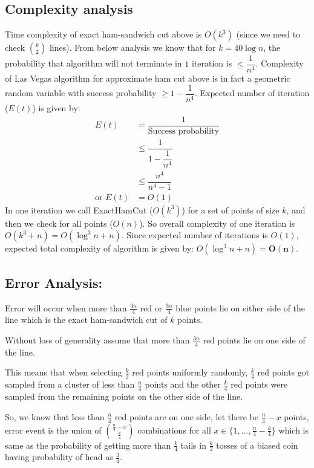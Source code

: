 \documentclass[a4paper]{article}
\newcommand{\V}[1]{\boldsymbol{#1}}
\begin{document}
\subsection*{Complexity analysis}
Time complexity of exact ham-sandwich cut above is $O(k^3)$ (since we need to check $k\choose2$ lines). From below analysis we know that for $k = 40\log n$, the probability that algorithm will not terminate in $1$ iteration is $\leq \dfrac{1}{n^4}$. Complexity of Las Vegas algorithm for approximate ham cut above is in fact a geometric random variable with success probability $\geq 1- \dfrac{1}{n^4}$. Expected number of iteration ($E(t)$) is given by:
\begin{align*} 
E(t) &= \dfrac{1}{\text{Success probability}} \\
	 &\leq \dfrac{1}{ 1- \dfrac{1}{n^4}} \\
	 &\leq \dfrac{n^4}{n^4 - 1} \\
\text{or } E(t) &= O(1)
\end{align*}
In one iteration we call ExactHamCut ($O(k^3)$) for a set of points of size $k$, and then we check for all points ($O(n)$). So overall complexity of one iteration is $O(k^3 + n) = O(\log^3 n + n)$. Since expected number of iterations is $O(1)$, expected total complexity of algorithm is given by: $O(\log^3 n + n) = \V{O(n)}$.


\subsection*{Error Analysis:}

Error will occur when more than $\frac{3n}{4}$ red or $\frac{3n}{4}$ blue points lie on either side of the line which is the exact ham-sandwich cut of $k$ points.

Without loss of generality assume that more than $\frac{3n}{4}$ red points lie on one side of the line.

This means that when selecting $\frac{k}{2}$ red points uniformly randomly, $\frac{k}{4}$ red points got sampled from a cluster of less than $\frac{n}{4}$ points and the other $\frac{k}{4}$ red points were sampled from the remaining points on the other side of the line.

So, we know that less than $\frac{n}{4}$ red points are on one side, let there be $\frac{n}{4} - x$ points, error event is the union of $\binom{\frac{n}{4} - x}{\frac{k}{4}}$ combinations for all $x \in \{1,...,\frac{n}{4} - \frac{k}{4}\}$ which is same as the probability of getting more than $\frac{k}{4}$ tails in $\frac{k}{2}$ tosses of a biased coin having probability of head as $\frac{3}{4}$.
\end{document}
